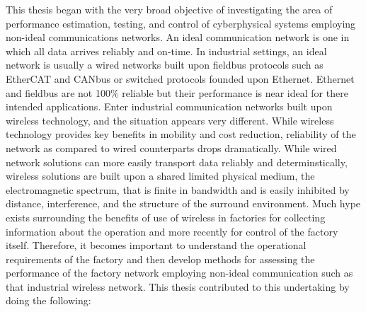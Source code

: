 This thesis began with the very broad objective of investigating the area of performance estimation, testing, and control of cyberphysical systems employing non-ideal communications networks.  An ideal communication network is one in which all data arrives reliably and on-time.  In industrial settings, an ideal network is usually a wired networks built upon fieldbus protocols such as EtherCAT and CANbus or switched protocols founded upon Ethernet.  Ethernet and fieldbus are not 100\% reliable but their performance is near ideal for there intended applications.  Enter industrial communication networks built upon wireless technology, and the situation appears very different.  While wireless technology provides key benefits in mobility and cost reduction, reliability of the network as compared to wired counterparts drops dramatically.  While wired network solutions can more easily transport data reliably and determinstically, wireless solutions are built upon a shared limited physical medium, the electromagnetic spectrum, that is finite in bandwidth and is easily inhibited by distance, interference, and the structure of the surround environment.  Much hype exists surrounding the benefits of use of wireless in factories for collecting information about the operation and more recently for control of the factory itself.  Therefore, it becomes important to understand the operational requirements of the factory and then develop methods for assessing the performance of the factory network employing non-ideal communication such as that industrial wireless network.  This thesis contributed to this undertaking by doing the following:

